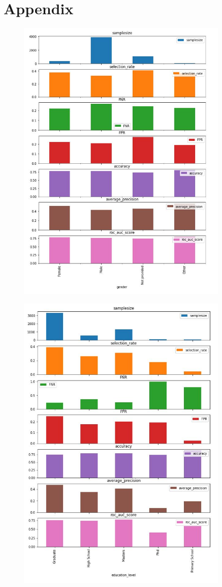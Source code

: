 \section{Appendix}
\begin{figure}
    \centering
\includegraphics[width=0.9\textwidth,height=0.98\textwidth]{gender.JPG}
    \label{fig: 1}
\end{figure}
\begin{figure}
    \centering
\includegraphics[width=0.9\textwidth,height=0.98\textwidth]{education.JPG}
    \label{fig: 2}
\end{figure}
